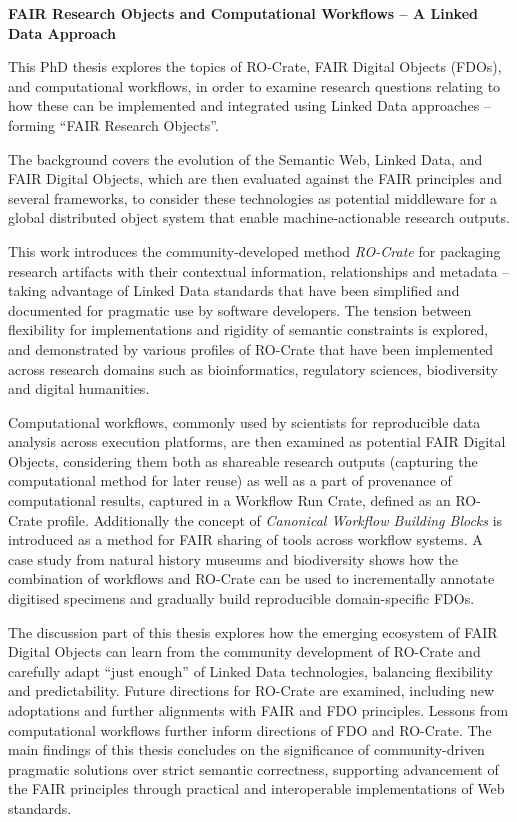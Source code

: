 \textbf{FAIR Research Objects and Computational Workflows – A Linked Data Approach}

This PhD thesis explores the topics of RO-Crate, FAIR Digital Objects (FDOs), and computational workflows, in order to examine research questions relating to how these can be implemented and integrated using Linked Data approaches -- forming ``FAIR Research Objects''.

The background covers the evolution of the Semantic Web, Linked Data, and FAIR Digital Objects, which are then evaluated against the FAIR principles and several frameworks, to consider these technologies as potential middleware for a global distributed object system that enable machine-actionable research outputs. 

This work introduces the community-developed method \emph{RO-Crate} for packaging research artifacts with their contextual information, relationships and metadata -- taking advantage of Linked Data standards that have been simplified and documented for pragmatic use by software developers. The tension between flexibility for implementations and rigidity of semantic constraints is explored, and demonstrated by various profiles of RO-Crate that have been implemented across research domains such as bioinformatics, regulatory sciences, biodiversity and digital humanities. 

Computational workflows, commonly used by scientists for reproducible data analysis across execution platforms, are then examined as potential FAIR Digital Objects, considering them both as shareable research outputs (capturing the computational method for later reuse) as well as a part of provenance of computational results, captured in a Workflow Run Crate, defined as an RO-Crate profile. 
Additionally the concept of \emph{Canonical Workflow Building Blocks} is introduced as a method for FAIR sharing of tools across workflow systems. A case study from natural history museums and biodiversity shows how the combination of workflows and RO-Crate can be used to incrementally annotate digitised specimens and gradually build reproducible domain-specific FDOs. 

The discussion part of this thesis explores how the emerging ecosystem of FAIR Digital Objects can learn from the community development of RO-Crate and carefully adapt ``just enough'' of Linked Data technologies, balancing flexibility and predictability. Future directions for RO-Crate are examined, including new adoptations and further alignments with FAIR and FDO principles. Lessons from computational workflows further inform directions of FDO and RO-Crate. The main findings of this thesis concludes on the significance of community-driven pragmatic solutions over strict semantic correctness, supporting advancement of the FAIR principles through practical and interoperable implementations of Web standards.

